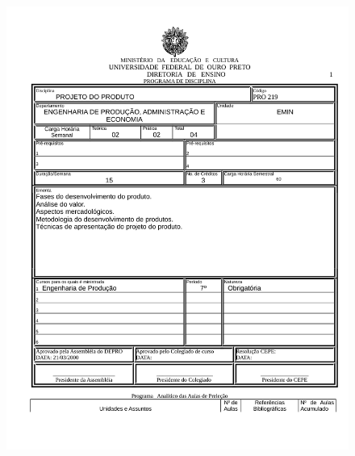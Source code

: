 \begin{figure}[p]
	\centering 
	\includegraphics[scale=0.7]{capitulos/anexo1-programas-disciplina/eg319.pdf}
\end{figure}

